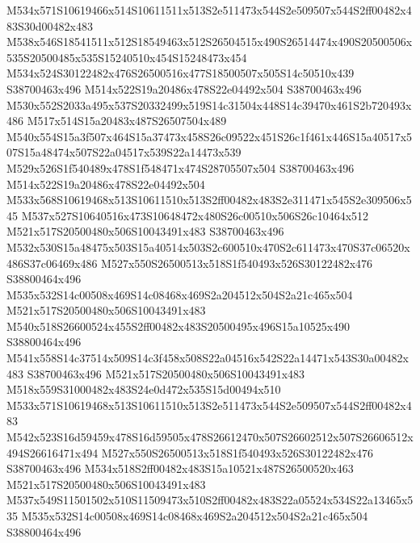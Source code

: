 \documentclass{article}
\begin{document}
\begin{multicols}{2}





M534x571S10619466x514S10611511x513S2e511473x544S2e509507x544S2ff00482x483S30d00482x483 M538x546S18541511x512S18549463x512S26504515x490S26514474x490S20500506x535S20500485x535S15240510x454S15248473x454 M534x524S30122482x476S26500516x477S18500507x505S14c50510x439 S38700463x496 M514x522S19a20486x478S22e04492x504 S38700463x496 M530x552S2033a495x537S20332499x519S14c31504x448S14c39470x461S2b720493x486 M517x514S15a20483x487S26507504x489 M540x554S15a3f507x464S15a37473x458S26c09522x451S26c1f461x446S15a40517x507S15a48474x507S22a04517x539S22a14473x539 M529x526S1f540489x478S1f548471x474S28705507x504 S38700463x496 M514x522S19a20486x478S22e04492x504 M533x568S10619468x513S10611510x513S2ff00482x483S2e311471x545S2e309506x545 M537x527S10640516x473S10648472x480S26c00510x506S26c10464x512 M521x517S20500480x506S10043491x483 S38700463x496 M532x530S15a48475x503S15a40514x503S2c600510x470S2c611473x470S37c06520x486S37c06469x486 M527x550S26500513x518S1f540493x526S30122482x476 S38800464x496 M535x532S14c00508x469S14c08468x469S2a204512x504S2a21c465x504 M521x517S20500480x506S10043491x483 M540x518S26600524x455S2ff00482x483S20500495x496S15a10525x490 S38800464x496 M541x558S14c37514x509S14c3f458x508S22a04516x542S22a14471x543S30a00482x483 S38700463x496 M521x517S20500480x506S10043491x483 M518x559S31000482x483S24e0d472x535S15d00494x510 M533x571S10619468x513S10611510x513S2e511473x544S2e509507x544S2ff00482x483 M542x523S16d59459x478S16d59505x478S26612470x507S26602512x507S26606512x494S26616471x494 M527x550S26500513x518S1f540493x526S30122482x476 S38700463x496 M534x518S2ff00482x483S15a10521x487S26500520x463 M521x517S20500480x506S10043491x483 M537x549S11501502x510S11509473x510S2ff00482x483S22a05524x534S22a13465x535 M535x532S14c00508x469S14c08468x469S2a204512x504S2a21c465x504 S38800464x496


\end{multicols}
\end{document}

